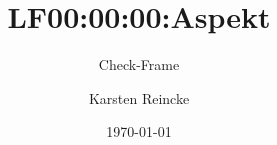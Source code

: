 \documentclass[]{beamer}
\title{LF00:00:00:Aspekt}
\subtitle{Check-Frame}
\institute[GS-LDK]{Gewerbliche Schulen Dillenburg}
\author{Karsten Reincke}
\date{\today}
\def\cfgGl{../../../../cfg.gl/}
\begin{document}

\begin{frame}
  \titlepage

  
\end{frame}






\logo{}
\newpage




\end{document}
